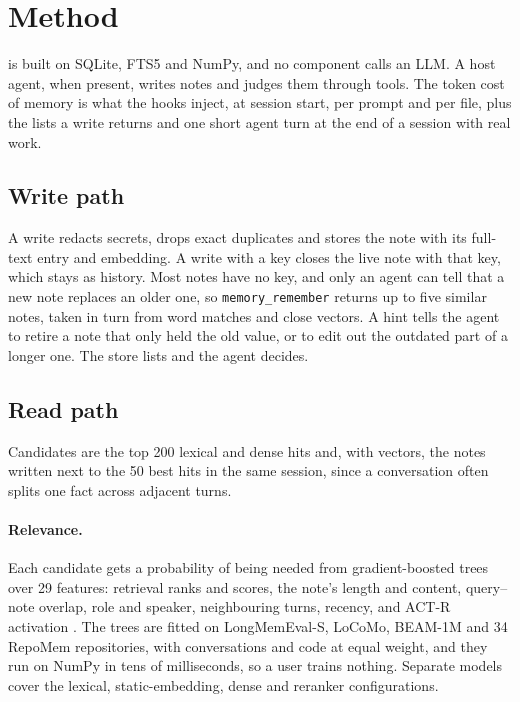 \section{Method}\label{sec:method}

\kanerva{} is built on SQLite, FTS5 and NumPy, and no component calls an LLM. A host agent, when present, writes notes and judges them through tools. The token cost of memory is what the hooks inject, at session start, per prompt and per file, plus the lists a write returns and one short agent turn at the end of a session with real work.

\subsection{Write path}
A write redacts secrets, drops exact duplicates and stores the note with its full-text entry and embedding. A write with a key closes the live note with that key, which stays as history. Most notes have no key, and only an agent can tell that a new note replaces an older one, so \texttt{memory\_remember} returns up to five similar notes, taken in turn from word matches and close vectors. A hint tells the agent to retire a note that only held the old value, or to edit out the outdated part of a longer one. The store lists and the agent decides.

\subsection{Read path}
Candidates are the top 200 lexical and dense hits and, with vectors, the notes written next to the 50 best hits in the same session, since a conversation often splits one fact across adjacent turns.

\paragraph{Relevance.} Each candidate gets a probability of being needed from gradient-boosted trees over 29 features: retrieval ranks and scores, the note's length and content, query--note overlap, role and speaker, neighbouring turns, recency, and ACT-R activation \cite{anderson2004integrated}. The trees are fitted on LongMemEval-S, LoCoMo, BEAM-1M and 34 RepoMem repositories, with conversations and code at equal weight, and they run on NumPy in tens of milliseconds, so a user trains nothing. Separate models cover the lexical, static-embedding, dense and reranker configurations.

